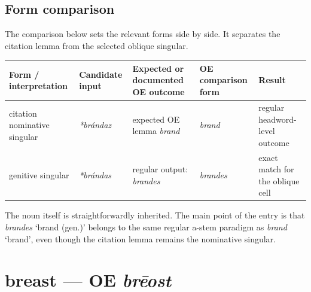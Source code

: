 \documentclass[
  british,
  a4paper,
  openany]{book}
\newcounter{none} %
\providecommand{\texorpdfstring}[2]{#1}
\begin{document}
\subsection{Form comparison}\label{form-comparison-4}

The comparison below sets the relevant forms side by side. It separates
the citation lemma from the selected oblique singular.

{\def\LTcaptype{none} %
\begin{longtable}[]{@{}
  >{\raggedright\arraybackslash}p{}
  >{\raggedright\arraybackslash}p{}
  >{\raggedright\arraybackslash}p{}
  >{\raggedright\arraybackslash}p{}
  >{\raggedright\arraybackslash}p{}@{}}
\toprule\noalign{}
\begin{minipage}[b]{\linewidth}\raggedright
Form / interpretation
\end{minipage} & \begin{minipage}[b]{\linewidth}\raggedright
Candidate input
\end{minipage} & \begin{minipage}[b]{\linewidth}\raggedright
Expected or documented OE outcome
\end{minipage} & \begin{minipage}[b]{\linewidth}\raggedright
OE comparison form
\end{minipage} & \begin{minipage}[b]{\linewidth}\raggedright
Result
\end{minipage} \\
\midrule\noalign{}
\endhead
\bottomrule\noalign{}
\endlastfoot
citation nominative singular & {\emph{*brándaz}} & expected OE lemma
{\emph{brand}} & {\emph{brand}} & regular headword-level outcome \\
genitive singular & {\emph{*brándas}} & regular output: {\emph{brandes}}
& {\emph{brandes}} & exact match for the oblique cell \\
\end{longtable}
}

The noun itself is straightforwardly inherited. The main point of the
entry is that {\emph{brandes}} `brand (gen.)' belongs to the same
regular a-stem paradigm as {\emph{brand}} `brand', even though the
citation lemma remains the nominative singular.

\section{\texorpdfstring{breast --- OE
\emph{brēost}}{breast --- OE brēost}}\label{breast-oe-brux113ost}
\end{document}
